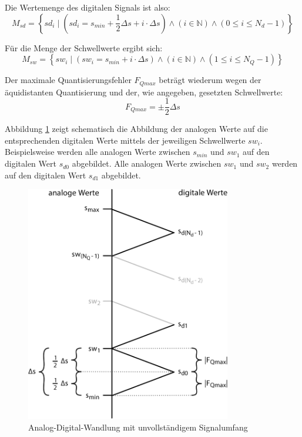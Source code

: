 \documentclass[11pt,a4paper]{scrreprt}
\begin{document}
Die Wertemenge des digitalen Signals ist also:
\[ 
	M_{sd} =  \left\{ sd_i \mid 
	                           \left(sd_i = s_{min} 
	                           + \frac{1}{2} \Delta s + i \cdot \Delta s\right)
                               \wedge (i \in \mathbb{N})
	                           \wedge (0 \le i \le N_d - 1)  \right\}
\]

Für die Menge der Schwellwerte ergibt sich:
\[ 
	M_{sw} =  \left\{ sw_i \mid 
	                           \left(sw_i = s_{min} + i \cdot \Delta s\right)
                               \wedge (i \in \mathbb{N})
	                           \wedge (1 \le i \le N_Q - 1)  \right\}
\]

Der maximale Quantisierungsfehler $F_{Qmax}$ beträgt wiederum wegen der äquidistanten Quantisierung und der, wie angegeben, gesetzten Schwellwerte:
\[ 
	F_{Qmax} = \pm \frac{1}{2} \Delta s
\]

Abbildung \ref{AD-Wandl_unvollst_Sig-Umf_ohne_delta} zeigt schematisch die Abbildung der analogen Werte auf die entsprechenden digitalen Werte mittels der jeweiligen Schwellwerte $sw_i$. Beispielsweise werden alle analogen Werte zwischen $s_{min}$ und $sw_1$ auf den digitalen Wert $s_{d0}$ abgebildet. Alle analogen Werte zwischen $sw_1$ und $sw_2$ werden auf den digitalen Wert $s_{d1}$ abgebildet.

\begin{figure}[htbp] %
	\centering
	\includegraphics[width=0.8\textwidth]{AD-Wandl_unvollst_Sig-Umf_ohne_delta.png}
	\caption{Analog-Digital-Wandlung mit unvollständigem Signalumfang}
	\label{AD-Wandl_unvollst_Sig-Umf_ohne_delta}
\end{figure}
\end{document}
